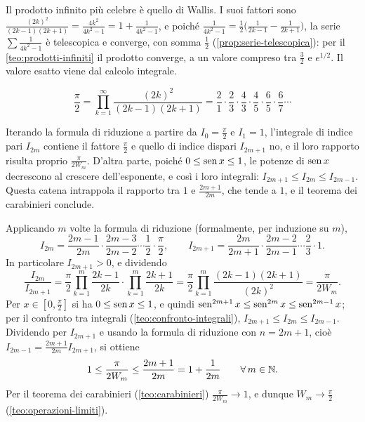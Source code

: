 Il prodotto infinito più celebre è quello di Wallis. I suoi fattori sono
$\frac{(2k)^{2}}{(2k-1)(2k+1)}=\frac{4k^{2}}{4k^{2}-1}=1+\frac1{4k^{2}-1}$, e poiché
$\frac1{4k^{2}-1}=\frac12\bigl(\frac1{2k-1}-\frac1{2k+1}\bigr)$, la serie $\sum\frac1{4k^{2}-1}$ è telescopica e
converge, con somma $\frac12$ (\cref{prop:serie-telescopica}): per il
\cref{teo:prodotti-infiniti} il prodotto converge, a un valore compreso tra $\frac32$ e
$e^{1/2}$. Il valore esatto viene dal calcolo integrale.

\begin{teorema}\label{teo:wallis}
\begin{equation}\label{eq:wallis}
  \frac\pi2=\prod_{k=1}^{\infty}\frac{(2k)^{2}}{(2k-1)(2k+1)}
  =\frac21\cdot\frac23\cdot\frac43\cdot\frac45\cdot\frac65\cdot\frac67\cdots
\end{equation}
\end{teorema}

\begin{schema}
\end{schema}

\begin{strategia}
Iterando la formula di riduzione a partire da $I_{0}=\frac\pi2$ e $I_{1}=1$, l'integrale di indice
pari $I_{2m}$ contiene il fattore $\frac\pi2$ e quello di indice dispari $I_{2m+1}$ no, e il loro
rapporto risulta proprio $\frac\pi{2W_{m}}$. D'altra parte, poiché $0\le\operatorname{sen} x\le1$, le potenze
di $\operatorname{sen} x$ decrescono al crescere dell'esponente, e così i loro integrali:
$I_{2m+1}\le I_{2m}\le I_{2m-1}$. Questa catena intrappola il rapporto tra $1$ e $\frac{2m+1}{2m}$, che
tende a $1$, e il teorema dei carabinieri conclude.
\end{strategia}

\begin{dimostrazione}
Applicando $m$ volte la formula di riduzione (formalmente, per induzione su $m$),
\[
  I_{2m}=\frac{2m-1}{2m}\cdot\frac{2m-3}{2m-2}\cdots\frac12\cdot\frac\pi2 ,\qquad
  I_{2m+1}=\frac{2m}{2m+1}\cdot\frac{2m-2}{2m-1}\cdots\frac23\cdot1 .
\]
In particolare $I_{2m+1}>0$, e dividendo
\[
  \frac{I_{2m}}{I_{2m+1}}=\frac\pi2\prod_{k=1}^{m}\frac{2k-1}{2k}\cdot\prod_{k=1}^{m}\frac{2k+1}{2k}
  =\frac\pi2\prod_{k=1}^{m}\frac{(2k-1)(2k+1)}{(2k)^{2}}=\frac\pi{2W_{m}} .
\]
Per $x\in[0,\frac\pi2]$ si ha $0\le\operatorname{sen} x\le1$, e quindi
$\operatorname{sen}^{2m+1}x\le\operatorname{sen}^{2m}x\le\operatorname{sen}^{2m-1}x$; per il confronto tra integrali
(\cref{teo:confronto-integrali}), $I_{2m+1}\le I_{2m}\le I_{2m-1}$. Dividendo per $I_{2m+1}$ e usando la
formula di riduzione con $n=2m+1$, cioè $I_{2m-1}=\frac{2m+1}{2m}I_{2m+1}$, si ottiene
\[
  1\le\frac\pi{2W_{m}}\le\frac{2m+1}{2m}=1+\frac1{2m} \qquad\forall\, m\in\mathbb{N} .
\]
Per il teorema dei carabinieri (\cref{teo:carabinieri}) $\frac\pi{2W_{m}}\to1$, e dunque
$W_{m}\to\frac\pi2$ (\cref{teo:operazioni-limiti}).
\end{dimostrazione}

